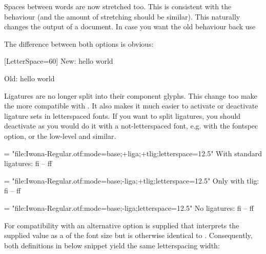          Spaces between words are now stretched too. This is consistent with the \XETEX behaviour (and the amount of stretching should be similar). This
         naturally changes the output of a document.  In case you want the old behaviour back use
         \beginlisting
         \endlisting

         The difference between both options is obvious:

         \begingroup
         [LetterSpace=60]
          New: hello world


          Old: hello world

          \endgroup


         Ligatures  are no longer split into their component glyphs.
         This change too make the  more compatible with \XETEX. It also makes it much easier to activate or deactivate ligature sets in letterspaced fonts.
         If you want to split ligatures, you should deactivate as you would do it with a not-letterspaced font, e.g. with the fontspec  option, or the low-level  and similar.


         {\font \test = "file:Iwona-Regular.otf:mode=base;+liga;+tlig;letterspace=12.5"
          \test With standard ligatures: fi -- ff\par

          \font \test = "file:Iwona-Regular.otf:mode=base;-liga;+tlig;letterspace=12.5"
          \test Only with tlig: fi -- ff \par

          \font \test = "file:Iwona-Regular.otf:mode=base;-liga;letterspace=12.5"
          \test No ligatures: fi -- ff \par
         }

         For compatibility with \XETEX an alternative
          option is supplied that interprets the
         supplied value as a  of the font size but
         is otherwise identical to .
         Consequently, both definitions in below snippet yield the same
         letterspacing width:

